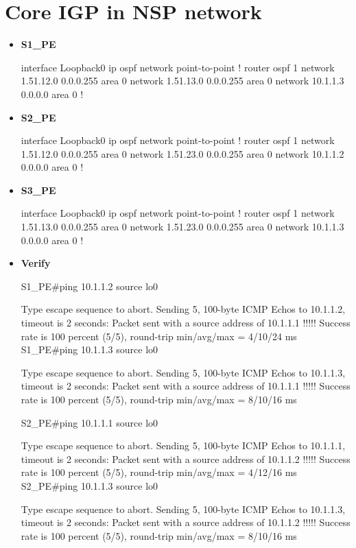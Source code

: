 \documentclass[10pt]{article}
\begin{document}
\section{Core IGP in NSP network} %
\label{sec:core_igp_in_nsp_network}
\begin{itemize}
	\item {\bf S1\_PE}
	\begin{verbatim*}
		interface Loopback0
		 ip ospf network point-to-point
		!
		router ospf 1
		 network 1.51.12.0 0.0.0.255 area 0
		 network 1.51.13.0 0.0.0.255 area 0
		 network 10.1.1.3 0.0.0.0 area 0
		!	
	\end{verbatim*}
	\item {\bf S2\_PE}
	\begin{verbatim*}
		interface Loopback0
		 ip ospf network point-to-point
		!
		router ospf 1
		 network 1.51.12.0 0.0.0.255 area 0
		 network 1.51.23.0 0.0.0.255 area 0
		 network 10.1.1.2 0.0.0.0 area 0
		!	
	\end{verbatim*}
	\item {\bf S3\_PE}
	\begin{verbatim*}
		interface Loopback0
		 ip ospf network point-to-point
		!
		router ospf 1
		 network 1.51.13.0 0.0.0.255 area 0
		 network 1.51.23.0 0.0.0.255 area 0
		 network 10.1.1.3 0.0.0.0 area 0
		!	
	\end{verbatim*}
	\item {\bf Verify}
	\begin{verbatim*}
		S1_PE#ping 10.1.1.2 source lo0

		Type escape sequence to abort.
		Sending 5, 100-byte ICMP Echos to 10.1.1.2, timeout is 2 seconds:
		Packet sent with a source address of 10.1.1.1 
		!!!!!
		Success rate is 100 percent (5/5), round-trip min/avg/max = 4/10/24 ms
		S1_PE#ping 10.1.1.3 source lo0

		Type escape sequence to abort.
		Sending 5, 100-byte ICMP Echos to 10.1.1.3, timeout is 2 seconds:
		Packet sent with a source address of 10.1.1.1 
		!!!!!
		Success rate is 100 percent (5/5), round-trip min/avg/max = 8/10/16 ms
		
		S2_PE#ping 10.1.1.1 source lo0

		Type escape sequence to abort.
		Sending 5, 100-byte ICMP Echos to 10.1.1.1, timeout is 2 seconds:
		Packet sent with a source address of 10.1.1.2 
		!!!!!
		Success rate is 100 percent (5/5), round-trip min/avg/max = 4/12/16 ms
		S2_PE#ping 10.1.1.3 source lo0

		Type escape sequence to abort.
		Sending 5, 100-byte ICMP Echos to 10.1.1.3, timeout is 2 seconds:
		Packet sent with a source address of 10.1.1.2 
		!!!!!
		Success rate is 100 percent (5/5), round-trip min/avg/max = 8/10/16 ms
		

\end{verbatim*}
\end{itemize}
\end{document}
